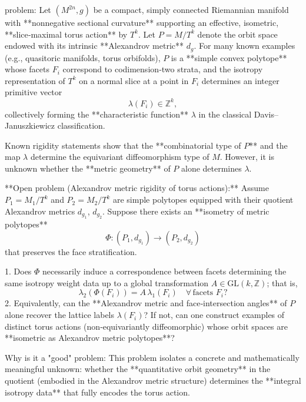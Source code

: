 problem:  
Let \( (M^{2n}, g) \) be a compact, simply connected Riemannian manifold with **nonnegative sectional curvature** supporting an effective, isometric, **slice‑maximal torus action** by \(T^k\).  
Let \(P = M/T^k\) denote the orbit space endowed with its intrinsic **Alexandrov metric** \(d_g\).  
For many known examples (e.g., quasitoric manifolds, torus orbifolds), \(P\) is a **simple convex polytope** whose facets \(F_i\) correspond to codimension‑two strata, and the isotropy representation of \(T^k\) on a normal slice at a point in \(F_i\) determines an integer primitive vector
\[
\lambda(F_i) \in \mathbb{Z}^k,
\]
collectively forming the **characteristic function** \(\lambda\) in the classical Davis–Januszkiewicz classification.

Known rigidity statements show that the **combinatorial type of \(P\)** and the map \(\lambda\) determine the equivariant diffeomorphism type of \(M\).  
However, it is unknown whether the **metric geometry** of \(P\) alone determines \(\lambda\).

**Open problem (Alexandrov metric rigidity of torus actions):**  
Assume \(P_1 = M_1/T^k\) and \(P_2 = M_2/T^k\) are simple polytopes equipped with their quotient Alexandrov metrics \(d_{g_1}\), \(d_{g_2}\).  
Suppose there exists an **isometry of metric polytopes**
\[
\Phi: (P_1,d_{g_1}) \to (P_2,d_{g_2})
\]
that preserves the face stratification.  

1. Does \(\Phi\) necessarily induce a correspondence between facets determining the same isotropy weight data up to a global transformation \(A \in \mathrm{GL}(k,\mathbb{Z})\); that is,
   \[
   \lambda_2(\Phi(F_i)) = A\,\lambda_1(F_i) \quad \forall\, \text{facets } F_i?
   \]
2. Equivalently, can the **Alexandrov metric and face‑intersection angles** of \(P\) alone recover the lattice labels \(\lambda(F_i)\)?  
If not, can one construct examples of distinct torus actions (non‑equivariantly diffeomorphic) whose orbit spaces are **isometric as Alexandrov metric polytopes**?

Why is it a "good" problem:  
This problem isolates a concrete and mathematically meaningful unknown: whether the **quantitative orbit geometry** in the quotient (embodied in the Alexandrov metric structure) determines the **integral isotropy data** that fully encodes the torus action.  

